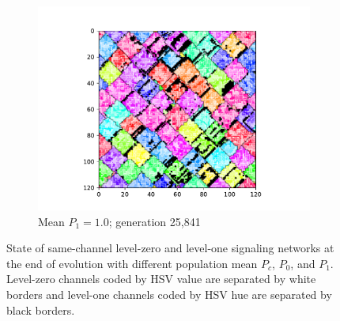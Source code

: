 \begin{figure}[t]
\begin{center}
\begin{subfigure}[b]{0.82\columnwidth}
  \includegraphics[width=\columnwidth,trim={2.5cm 0.5cm 2.5cm 1cm},clip]{img/ChannelMap_1008_update19500000}
  \caption{Mean $P_1 = 1.0$; generation 25,841}
  \label{fig:ChannelMap_1008}
\end{subfigure}

\caption{
State of same-channel level-zero and level-one signaling networks at the end of evolution with different population mean $P_{c}$, $P_0$, and $P_1$.
Level-zero channels coded by HSV value are separated by white borders and level-one channels coded by HSV hue are separated by black borders.
}
\label{fig:outcome_grids}
\end{center}
\end{figure}
